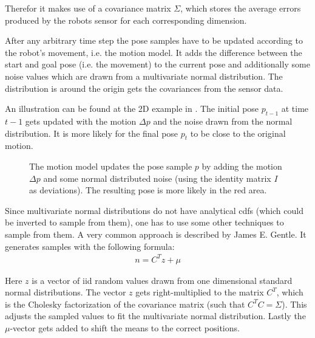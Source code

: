 \documentclass[Thesis.tex]{subfiles}
\begin{document}
Therefor it makes use of a covariance matrix $\Sigma$, which stores the average errors produced by the robots sensor for each corresponding dimension.

After any arbitrary time step the pose samples have to be updated according to the robot's movement, i.e. the motion model. It adds the difference between the start and goal pose (i.e. the movement) to the current pose and additionally some noise values which are drawn from a multivariate normal distribution. The distribution is around the origin gets the covariances from the sensor data. 

An illustration can be found at the 2D example in . The initial pose $p_{t-1}$ at time $t-1$ gets updated with the motion $\Delta p$ and the noise drawn from the normal distribution. It is more likely for the final pose $p_t$ to be close to the original motion.
\begin{figure}[!htp]
  \caption{The motion model updates the pose sample $p$ by adding the motion $\Delta p$ and some normal distributed noise (using the identity matrix $I$ as deviations). The resulting pose is more likely in the red area.}
  \label{fig:2d_noise_sampling}
\end{figure}
%
Since multivariate normal distributions do not have analytical \gls{cdf}s (which could be inverted to sample from them), one has to use some other techniques to sample from them. A very common approach is described by James E. Gentle\cite[p.~197]{Gentle:2005}. It generates samples with the following formula:
%
\begin{align}
n = C^T z + \mu
\end{align}

Here $z$ is a vector of \gls{iid} random values drawn from one dimensional standard normal distributions. The vector $z$ gets right-multiplied to the matrix $C^T$, which is the Cholesky factorization of the covariance matrix (such that $C^TC = \Sigma$). This adjusts the sampled values to fit the multivariate normal distribution. Lastly the $\mu$-vector gets added to shift the means to the correct positions.
\end{document}
